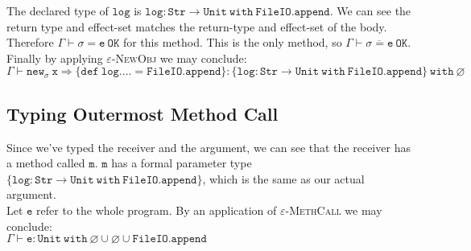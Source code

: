 \documentclass{llncs}
\newcommand{\kwa}[1]{\mathtt{#1}}
\begin{document}
\noindent
The declared type of $\kwa{log}$ is $\kwa{log : Str \rightarrow Unit~with~ FileIO.append}$. We can see the return type and effect-set matches the return-type and effect-set of the body. Therefore $\kwa{\Gamma \vdash \sigma = e~OK}$ for this method. This is the only method, so $\kwa{\Gamma \vdash \overline{\sigma = e}~OK}$.\\

\noindent
Finally by applying \textsc{$\varepsilon$-NewObj} we may conclude:\\
$\kwa{\Gamma \vdash new_\sigma~x \Rightarrow \{ def~log.... = FileIO.append \} : \{ log : Str \rightarrow Unit~with~FileIO.append \} ~with~\varnothing}$

\subsection*{Typing Outermost Method Call}

Since we've typed the receiver and the argument, we can see that the receiver has a method called $\kwa{m}$. $\kwa{m}$ has a formal parameter type $\kwa{\{ log : Str \rightarrow Unit~with~FileIO.append \}}$, which is the same as our actual argument.\\

\noindent
Let $\kwa{e}$ refer to the whole program. By an application of \textsc{$\varepsilon$-MethCall} we may conclude: \\
$\kwa{\Gamma \vdash e : Unit~with~\varnothing \cup \varnothing \cup FileIO.append}$
\end{document}
